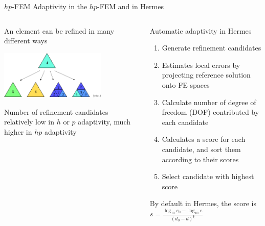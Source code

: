 \begin{frame}{$hp$-FEM}
  {Adaptivity in the $hp$-FEM and in Hermes}
  
  \begin{columns}
  \begin{column}{5cm}
    \tiny
    An element can be refined in many different ways

     \includegraphics[width=5cm]{figures/refinements}
     
     \vspace{.3cm}
     
     Number of refinement candidates relatively low in $ h $ or $ p $ adaptivity, much higher in $ hp $ adaptivity
      

  \end{column}
  \begin{column}{7cm}
  \scriptsize  
  \begin{block}{Automatic adaptivity in Hermes}
    \begin{enumerate}
    \item Generate refinement candidates
    \item Estimates local errors by projecting reference solution onto FE spaces
    \item Calculate number of degree of freedom (DOF) contributed by each candidate
    \item Calculates a score for each candidate, and sort them according to their scores
    \item Select candidate with highest score
    \end{enumerate}
  \end{block}

    By default in Hermes, the score is $ s = \frac{\log_{10} e_{0} - \log_{10} e}{(d_{0} - d)^{\xi}} $
    

  \end{column}
  \end{columns}

\end{frame}



